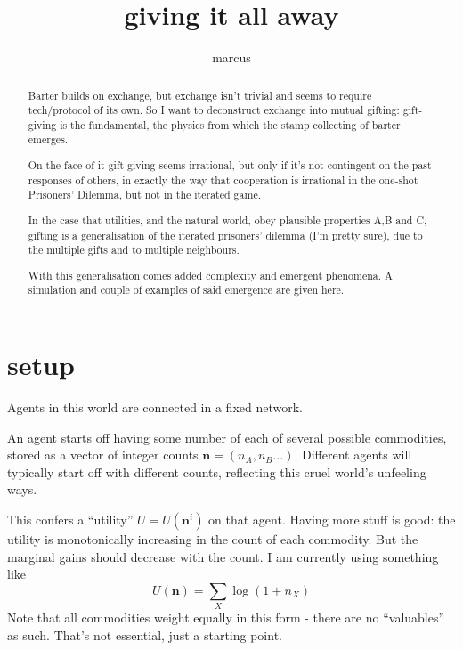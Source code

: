 \documentclass[11pt]{article}
\title{giving it all away}
\author{marcus}
\date{}
\begin{document}
\maketitle

\begin{abstract}
Barter builds on exchange, but exchange isn't trivial and seems to
require tech/protocol of its own. So I want to deconstruct exchange
into mutual gifting: gift-giving is the fundamental, the physics from
which the stamp collecting of barter emerges.

On the face of it gift-giving seems irrational, but only if it's not contingent on the
past responses of others, in exactly the way that cooperation is irrational
in the one-shot Prisoners' Dilemma,  but not in the iterated game.

In the case that utilities, and the natural world, obey plausible
properties A,B and C, gifting is a generalisation of the iterated
prisoners' dilemma (I'm pretty sure), due to the multiple gifts and to
multiple neighbours.

With this generalisation comes added complexity and emergent phenomena. 
A simulation and  couple of examples of said emergence are given here.

\end{abstract}

\section{setup}



Agents in this world are connected in a fixed network.

An agent starts off having some number of each of several possible commodities, stored as a
vector of integer counts $\mathbf{n} = (n_A, n_B \ldots )$. Different
agents will typically start off with different counts, reflecting this
cruel world's unfeeling ways.

This confers a ``utility'' $U = U(\mathbf{n}^i)$ on that agent. Having more stuff
is good: the utility is monotonically increasing in the count of each commodity.  But the marginal
gains should decrease with the count. I am currently using something
like
\[
U(\mathbf{n}) = \sum_X \log (1 + n_X)
\]
Note that all commodities weight equally in this form - there are no
``valuables'' as such. That's not essential, just a starting point.
\end{document}
